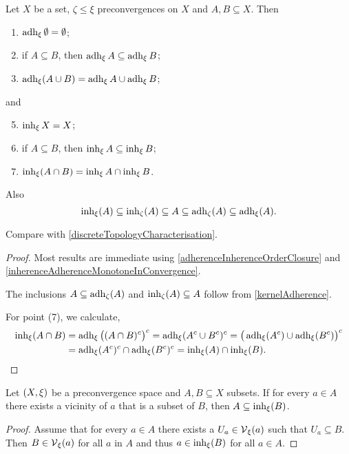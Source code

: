 \begin{corollary} \label{principalInherenceAdherenceProperties}
Let $X$ be a set, $\zeta\leq \xi$ preconvergences on $X$ and $A,B \subseteq X$. Then
\begin{enumerate}
\item $\operatorname{adh}_\xi \emptyset = \emptyset$;
\item if $A \subseteq B$, then $\operatorname{adh}_\xi A \subseteq \operatorname{adh}_\xi B$;
\item $\operatorname{adh}_\xi(A\cup B) = \operatorname{adh}_\xi A \cup \operatorname{adh}_\xi B$;
\end{enumerate}
and
\begin{enumerate} \setcounter{enumi}{4}
\item $\operatorname{inh}_\xi X = X$;
\item if $A \subseteq B$, then $\operatorname{inh}_\xi A \subseteq \operatorname{inh}_\xi B$;
\item $\operatorname{inh}_\xi(A\cap B) = \operatorname{inh}_\xi A \cap \operatorname{inh}_\xi B$.
\end{enumerate}
Also
\[ \operatorname{inh}_\xi(A) \subseteq \operatorname{inh}_\zeta(A) \subseteq A \subseteq \operatorname{adh}_\zeta(A) \subseteq \operatorname{adh}_\xi(A). \]
\end{corollary}
Compare with \ref{discreteTopologyCharacterisation}.
\begin{proof}
Most results are immediate using \ref{adherenceInherenceOrderClosure} and \ref{inherenceAdherenceMonotoneInConvergence}.

The inclusions $A \subseteq \operatorname{adh}_\zeta(A)$ and $\operatorname{inh}_\zeta(A) \subseteq A$ follow from \ref{kernelAdherence}.

For point (7), we calculate,
\begin{align*}
\operatorname{inh}_\xi(A\cap B) &= \operatorname{adh}_\xi\big((A\cap B)^c\big)^c = \operatorname{adh}_\xi(A^c\cup B^c)^c = \big(\operatorname{adh}_\xi(A^c)\cup \operatorname{adh}_\xi(B^c)\big)^c \\
&= \operatorname{adh}_\xi(A^c)^c\cap \operatorname{adh}_\xi(B^c)^c = \operatorname{inh}_\xi(A) \cap \operatorname{inh}_\xi(B).
\end{align*}
\end{proof}


\begin{lemma} \label{subsetWithVicinitiesInInherence}
Let $\sSet{X,\xi}$ be a preconvergence space and $A,B\subseteq X$ subsets. If for every $a\in A$ there exists a vicinity of $a$ that is a subset of $B$, then $A\subseteq \operatorname{inh}_\xi(B)$.
\end{lemma}
\begin{proof}
Assume that for every $a\in A$ there exists a $U_a \in \operatorname{\mathcal{V}}_\xi(a)$ such that $U_a \subseteq B$. Then $B\in \operatorname{\mathcal{V}}_\xi(a)$ for all $a$ in $A$ and thus $a\in \operatorname{inh}_\xi(B)$ for all $a\in A$.
\end{proof}

